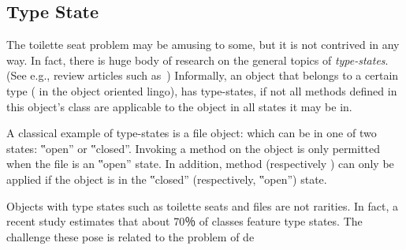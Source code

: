 \subsection{Type State}
The toilette seat problem may be amusing to some, but it is not contrived in any way.
In fact, there is huge body of research on the general topics of
  \emph{type-states}. (See e.g., review articles such as~\cite{Tom:Jerry:2001,Ben:Jerry:1934})
Informally, an object that belongs to a certain type ( in the
object oriented lingo), has type-states, if not all methods defined in this object's class are applicable to the object in all states it may be in.

A classical example of type-states is a file object: which can be in one of two states:
‟open” or ‟closed”. Invoking a  method on the object is only permitted when the file is an ‟open” state.
In addition, method  (respectively ) can only be applied if the object is in the ‟closed” (respectively, ‟open”) state.

Objects with type states such as toilette seats and files are not rarities.
In fact, a recent study estimates that about 70％ of \Java classes feature type states.
The challenge these pose is related to the problem of de
